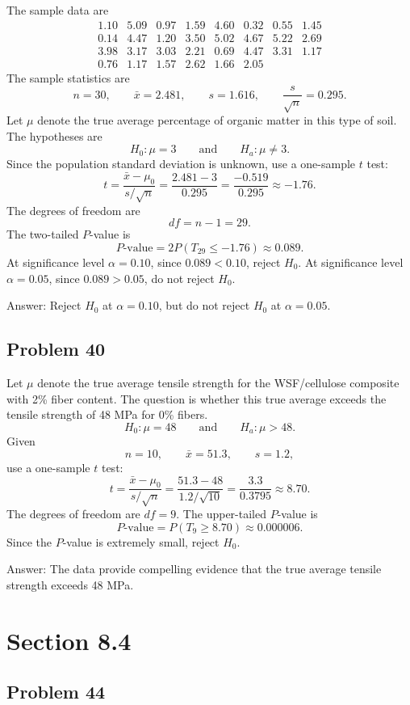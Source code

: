 \documentclass[11pt]{article}
\begin{document}
The sample data are
\[
\begin{array}{rrrrrrrr}
1.10&5.09&0.97&1.59&4.60&0.32&0.55&1.45\\
0.14&4.47&1.20&3.50&5.02&4.67&5.22&2.69\\
3.98&3.17&3.03&2.21&0.69&4.47&3.31&1.17\\
0.76&1.17&1.57&2.62&1.66&2.05
\end{array}
\]
The sample statistics are
\[
n=30,
\qquad \bar{x}=2.481,
\qquad s=1.616,
\qquad \frac{s}{\sqrt{n}}=0.295.
\]
Let $\mu$ denote the true average percentage of organic matter in this type of soil. The hypotheses are
\[
H_0:\mu=3
\qquad \text{and} \qquad
H_a:\mu\neq 3.
\]
Since the population standard deviation is unknown, use a one-sample $t$ test:
\[
t=\frac{\bar{x}-\mu_0}{s/\sqrt{n}}
=\frac{2.481-3}{0.295}
=\frac{-0.519}{0.295}
\approx -1.76.
\]
The degrees of freedom are
\[
df=n-1=29.
\]
The two-tailed $P$-value is
\[
P\text{-value}=2P(T_{29}\le -1.76)\approx 0.089.
\]
At significance level $\alpha=0.10$, since $0.089<0.10$, reject $H_0$. At significance level $\alpha=0.05$, since $0.089>0.05$, do not reject $H_0$.

Answer: Reject $H_0$ at $\alpha=0.10$, but do not reject $H_0$ at $\alpha=0.05$.

\subsection*{Problem 40}

Let $\mu$ denote the true average tensile strength for the WSF/cellulose composite with 2\% fiber content. The question is whether this true average exceeds the tensile strength of 48 MPa for 0\% fibers.
\[
H_0:\mu=48
\qquad \text{and} \qquad
H_a:\mu>48.
\]
Given
\[
n=10,
\qquad \bar{x}=51.3,
\qquad s=1.2,
\]
use a one-sample $t$ test:
\[
t=\frac{\bar{x}-\mu_0}{s/\sqrt{n}}
=\frac{51.3-48}{1.2/\sqrt{10}}
=\frac{3.3}{0.3795}
\approx 8.70.
\]
The degrees of freedom are $df=9$. The upper-tailed $P$-value is
\[
P\text{-value}=P(T_9\ge 8.70)\approx 0.000006.
\]
Since the $P$-value is extremely small, reject $H_0$.

Answer: The data provide compelling evidence that the true average tensile strength exceeds 48 MPa.

\section*{Section 8.4}

\subsection*{Problem 44}
\end{document}

